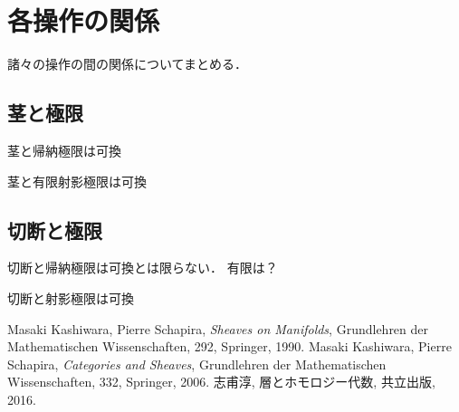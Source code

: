 \section{各操作の関係}

諸々の操作の間の関係についてまとめる．

\subsection{茎と極限}
茎と帰納極限は可換

茎と有限射影極限は可換
\subsection{切断と極限}
切断と帰納極限は可換とは限らない．
有限は？

切断と射影極限は可換




























\begin{thebibliography}{20} 
     Masaki Kashiwara, Pierre Schapira, 
        \textit{Sheaves on Manifolds}, 
        Grundlehren der Mathematischen Wissenschaften, 292, Springer, 1990.
         Masaki Kashiwara, Pierre Schapira, 
        \textit{Categories and Sheaves}, 
        Grundlehren der Mathematischen Wissenschaften, 332, Springer, 2006.
         志甫淳, 層とホモロジー代数, 共立出版, 2016.
\end{thebibliography}




